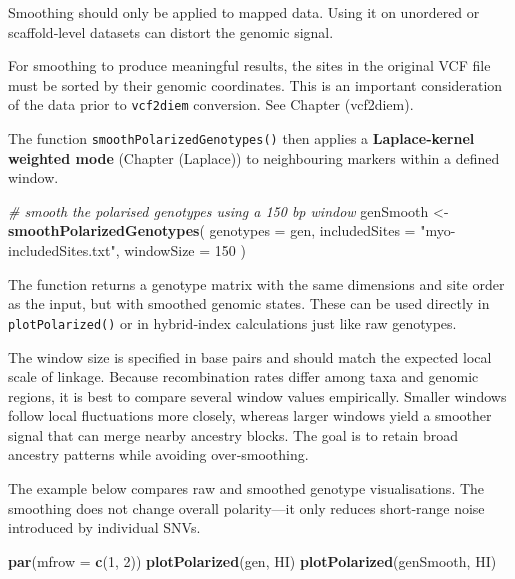 \documentclass[
]{book}
\newenvironment{Shaded}{\begin{snugshade}}{\end{snugshade}}
\newcommand{\AttributeTok}[1]{\textcolor[rgb]{0.13,0.29,0.53}{#1}}
\newcommand{\CommentTok}[1]{\textcolor[rgb]{0.56,0.35,0.01}{\textit{#1}}}
\newcommand{\DecValTok}[1]{\textcolor[rgb]{0.00,0.00,0.81}{#1}}
\newcommand{\FunctionTok}[1]{\textcolor[rgb]{0.13,0.29,0.53}{\textbf{#1}}}
\newcommand{\NormalTok}[1]{#1}
\newcommand{\OtherTok}[1]{\textcolor[rgb]{0.56,0.35,0.01}{#1}}
\newcommand{\StringTok}[1]{\textcolor[rgb]{0.31,0.60,0.02}{#1}}
\begin{document}
Smoothing should only be applied to mapped data. Using it on unordered or scaffold‑level datasets can distort the genomic signal.

For smoothing to produce meaningful results, the sites in the original VCF file must be sorted by their genomic coordinates. This is an important consideration of the data prior to \texttt{vcf2diem} conversion. See Chapter \citet{ref}(vcf2diem).

The function \texttt{smoothPolarizedGenotypes()} then applies a \textbf{Laplace‑kernel weighted mode} (Chapter \citet{ref}(Laplace)) to neighbouring markers within a defined window.

\begin{Shaded}
\begin{Highlighting}[]
\CommentTok{\# smooth the polarised genotypes using a 150 bp window}
\NormalTok{genSmooth }\OtherTok{\textless{}{-}} \FunctionTok{smoothPolarizedGenotypes}\NormalTok{(}
  \AttributeTok{genotypes =}\NormalTok{ gen,}
  \AttributeTok{includedSites =} \StringTok{"myo{-}includedSites.txt"}\NormalTok{,}
  \AttributeTok{windowSize =} \DecValTok{150}
\NormalTok{)}
\end{Highlighting}
\end{Shaded}

The function returns a genotype matrix with the same dimensions and site order as the input, but with smoothed genomic states. These can be used directly in \texttt{plotPolarized()} or in hybrid‑index calculations just like raw genotypes.

The window size is specified in base pairs and should match the expected local scale of linkage. Because recombination rates differ among taxa and genomic regions, it is best to compare several window values empirically. Smaller windows follow local fluctuations more closely, whereas larger windows yield a smoother signal that can merge nearby ancestry blocks. The goal is to retain broad ancestry patterns while avoiding over‑smoothing.

The example below compares raw and smoothed genotype visualisations. The smoothing does not change overall polarity---it only reduces short‑range noise introduced by individual SNVs.

\begin{Shaded}
\begin{Highlighting}[]
\FunctionTok{par}\NormalTok{(}\AttributeTok{mfrow =} \FunctionTok{c}\NormalTok{(}\DecValTok{1}\NormalTok{, }\DecValTok{2}\NormalTok{))}
\FunctionTok{plotPolarized}\NormalTok{(gen, HI)}
\FunctionTok{plotPolarized}\NormalTok{(genSmooth, HI)}
\end{Highlighting}
\end{Shaded}
\end{document}
